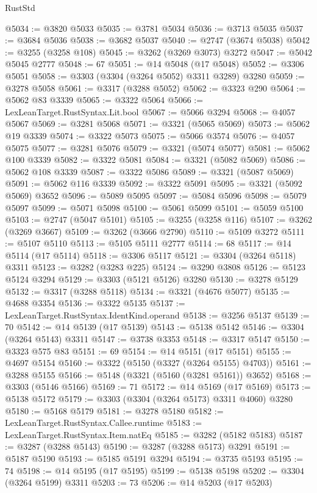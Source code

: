 \begin{lexlean}{RustStd}
\begin{coremodule}
@5034 := @3820 @5033
@5035 := @3781 @5034
@5036 := @3713 @5035
@5037 := @3684 @5036
@5038 := @3682 @5037
@5040 := @2747 (@3674 @5038)
@5042 := @3255 (@3258 @108)
@5045 := @3262 (@3269 @3073) @3272
@5047 := @5042 @5045 @2777
@5048 := 67
@5051 := @14 @5048 (@17 @5048)
@5052 := @3306 @5051
@5058 := @3303 (@3304 (@3264 @5052) @3311 @3289) @3280
@5059 := @3278 @5058
@5061 := @3317 (@3288 @5052)
@5062 := @3323 @290
@5064 := @5062 @83 @3339
@5065 := @3322 @5064
@5066 := LexLeanTarget.RustSyntax.Lit.bool
@5067 := @5066 @3294
@5068 := @4057 @5067
@5069 := @3281 @5068
@5071 := @3321 (@5065 @5069)
@5073 := @5062 @19 @3339
@5074 := @3322 @5073
@5075 := @5066 @3574
@5076 := @4057 @5075
@5077 := @3281 @5076
@5079 := @3321 (@5074 @5077)
@5081 := @5062 @100 @3339
@5082 := @3322 @5081
@5084 := @3321 (@5082 @5069)
@5086 := @5062 @108 @3339
@5087 := @3322 @5086
@5089 := @3321 (@5087 @5069)
@5091 := @5062 @116 @3339
@5092 := @3322 @5091
@5095 := @3321 (@5092 @5069) @3652
@5096 := @5089 @5095
@5097 := @5084 @5096
@5098 := @5079 @5097
@5099 := @5071 @5098
@5100 := @5061 @5099
@5101 := @5059 @5100
@5103 := @2747 (@5047 @5101)
@5105 := @3255 (@3258 @116)
@5107 := @3262 (@3269 @3667)
@5109 := @3262 (@3666 @2790)
@5110 := @5109 @3272
@5111 := @5107 @5110
@5113 := @5105 @5111 @2777
@5114 := 68
@5117 := @14 @5114 (@17 @5114)
@5118 := @3306 @5117
@5121 := @3304 (@3264 @5118) @3311
@5123 := @3282 (@3283 @225)
@5124 := @3290 @3808
@5126 := @5123 @5124 @3294
@5129 := @3303 (@5121 @5126) @3280
@5130 := @3278 @5129
@5132 := @3317 (@3288 @5118)
@5134 := @3321 (@4676 @5077)
@5135 := @4688 @3354
@5136 := @3322 @5135
@5137 := LexLeanTarget.RustSyntax.IdentKind.operand
@5138 := @3256 @5137
@5139 := 70
@5142 := @14 @5139 (@17 @5139)
@5143 := @5138 @5142
@5146 := @3304 (@3264 @5143) @3311
@5147 := @3738 @3353
@5148 := @3317 @5147
@5150 := @3323 @575 @83
@5151 := 69
@5154 := @14 @5151 (@17 @5151)
@5155 := @4697 @5154
@5160 := @3322 (@5150 (@3327 (@3264 @5155) @4703))
@5161 := @3288 @5155
@5166 := @5148 (@3321 (@5160 (@3281 @5161)) @3652)
@5168 := @3303 (@5146 @5166)
@5169 := 71
@5172 := @14 @5169 (@17 @5169)
@5173 := @5138 @5172
@5179 := @3303 (@3304 (@3264 @5173) @3311 @4060) @3280
@5180 := @5168 @5179
@5181 := @3278 @5180
@5182 := LexLeanTarget.RustSyntax.Callee.runtime
@5183 := LexLeanTarget.RustSyntax.Item.natEq
@5185 := @3282 (@5182 @5183)
@5187 := @3287 (@3288 @5143)
@5190 := @3287 (@3288 @5173) @3291
@5191 := @5187 @5190
@5193 := @5185 @5191 @3294
@5194 := @3735 @5193
@5195 := 74
@5198 := @14 @5195 (@17 @5195)
@5199 := @5138 @5198
@5202 := @3304 (@3264 @5199) @3311
@5203 := 73
@5206 := @14 @5203 (@17 @5203)

\end{coremodule}
\end{lexlean}
